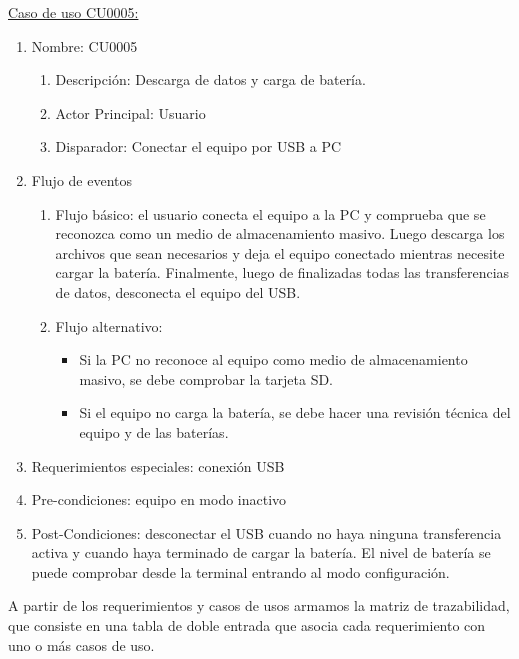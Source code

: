 	\underline{Caso de uso CU0005:}

	\begin{enumerate} 
		\item Nombre: CU0005
		\begin{enumerate} [label*=\arabic*.]
			\item Descripción: Descarga de datos y carga de batería.
			\item Actor Principal: Usuario
			\item Disparador: Conectar el equipo por USB a PC
		\end{enumerate}
		\item Flujo de eventos
		\begin{enumerate} [label*=\arabic*.]
			\item Flujo básico: el usuario conecta el equipo a la PC y comprueba que se reconozca como un medio de almacenamiento masivo. Luego descarga los archivos que sean necesarios y deja el equipo conectado mientras necesite cargar la batería. Finalmente, luego de finalizadas todas las transferencias de datos, desconecta el equipo del USB.
			\item Flujo alternativo:
			\begin{itemize}
				\item Si la PC no reconoce al equipo como medio de almacenamiento masivo, se debe comprobar la tarjeta SD.
				\item Si el equipo no carga la batería, se debe hacer una revisión técnica del equipo y de las baterías.			
			\end{itemize}				
		\end{enumerate}

		\item Requerimientos especiales: conexión USB
		\item Pre-condiciones: equipo en modo inactivo
		\item Post-Condiciones: desconectar el USB cuando no haya ninguna transferencia activa y cuando haya terminado de cargar la batería. El nivel de batería se puede comprobar desde la terminal entrando al modo configuración.
	\end{enumerate}
	
A partir de los requerimientos y casos de usos armamos la matriz de trazabilidad, que consiste en una tabla de doble entrada que asocia cada requerimiento con uno o más casos de uso.

